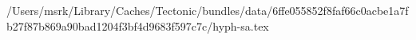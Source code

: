 /Users/msrk/Library/Caches/Tectonic/bundles/data/6ffe055852f8faf66c0acbe1a7fb27f87b869a90bad1204f3bf4d9683f597c7c/hyph-sa.tex